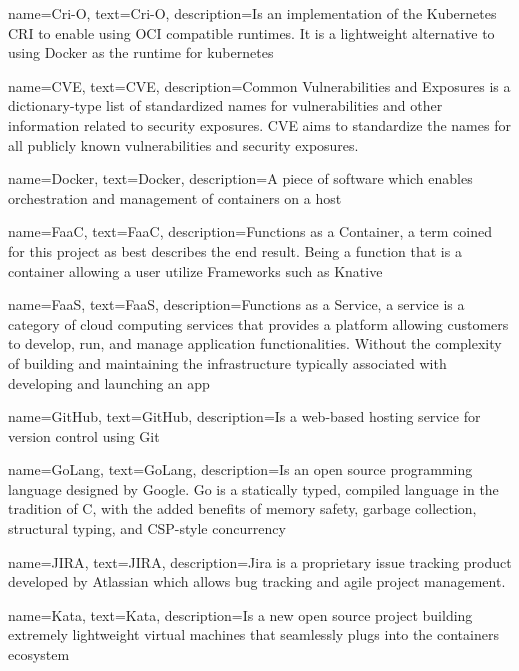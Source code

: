 {
    name={Cri-O},
    text={Cri-O},
    description={Is an implementation of the Kubernetes \gls{CRI} to enable using \gls{OCI} compatible runtimes. It is a lightweight alternative to using Docker as the runtime for kubernetes}
}

{
    name={CVE},
    text={CVE},
    description={Common Vulnerabilities and Exposures is a dictionary-type list of standardized names for vulnerabilities and other information related to security exposures. CVE aims to standardize the names for all publicly known vulnerabilities and security exposures.}
}



{
    name={Docker},
    text={Docker},
    description={A piece of software which enables orchestration and management of containers on a host}
}

{
    name={FaaC},
    text={FaaC},
    description={Functions as a Container, a term coined for this project as best describes the end result. Being a function that is a container allowing a user utilize Frameworks such as \gls{Knative}}
}

{
    name={FaaS},
    text={FaaS},
    description={Functions as a Service, a service is a category of cloud computing services that provides a platform allowing customers to develop, run, and manage application functionalities. Without the complexity of building and maintaining the infrastructure typically associated with developing and launching an app}
}

{
    name={GitHub},
    text={GitHub},
    description={Is a web-based hosting service for version control using Git}
}

{
    name={GoLang},
    text={GoLang},
    description={Is an open source programming language designed by Google. Go is a statically typed, compiled language in the tradition of C, with the added benefits of memory safety, garbage collection, structural typing, and CSP-style concurrency}
}

{
    name={JIRA},
    text={JIRA},
    description={Jira is a proprietary issue tracking product developed by Atlassian which allows bug tracking and agile project management.}
}

{
    name={Kata},
    text={Kata},
    description={Is a new open source project building extremely lightweight virtual machines that seamlessly plugs into the containers ecosystem}
}

